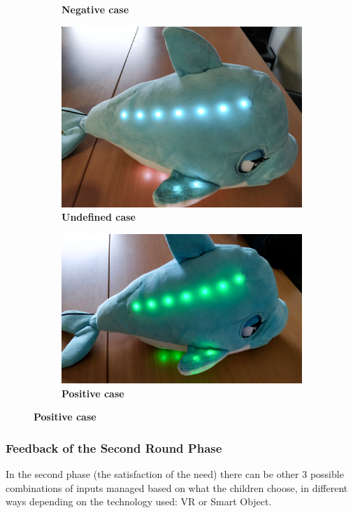\documentclass [12pt]{article}
\begin{document}
\begin{itemize}[•]
\begin{figure}[h!]
\begin{subfigure}[tl]{0.3\linewidth}
\caption{\textbf{Negative case}}
\end{subfigure}\hfill
\begin{subfigure}[tr]{0.3\linewidth}
\includegraphics[width=\linewidth]{UndefinedCaseSam.jpg}
\caption{\textbf{Undefined case}}
\end{subfigure}
\hspace*{\fill}
\begin{subfigure}[tr]{0.3\linewidth}
\includegraphics[width=\linewidth]{PositiveCaseSam.jpg}
\caption{\textbf{Positive case}}
\end{subfigure}
\hspace*{\fill}
\end{figure}
\end{itemize}


\clearpage
\subsubsection{Feedback of the Second Round Phase}
In the second phase (the satisfaction of the need) there can be other 3 possible combinations of inputs managed based on what the children choose, in different ways depending on the technology used: VR or Smart Object.
\end{document}
